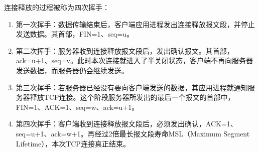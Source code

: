 连接释放的过程被称为四次挥手：

\begin{enumerate}
	\item 第一次挥手：数据传输结束后，客户端应用进程发出连接释放报文段，并停止发送数据。其首部，FIN=1、seq=u。

	\item 第二次挥手：服务器收到连接释放报文段后，发出确认报文。其首部，ack=u+1、seq=v。此时本次连接就进入了半关闭状态，客户端不再向服务器发送数据，而服务器仍会继续发送。

	\item 第三次挥手：若服务器已经没有要向客户端发送的数据，其应用进程就通知服务器释放TCP连接。这个阶段服务器所发出的最后一个报文的首部中，FIN=1、ACK=1、seq=w、ack=u+1。

	\item 第四次挥手：客户端收到连接释放报文段后，必须发出确认，ACK=1、seq=u+1、ack=w+1。再经过2倍最长报文段寿命MSL（Maximum Segment Lifetime），本次TCP连接真正结束。
\end{enumerate}

\newpage
